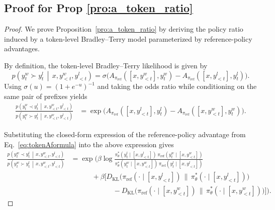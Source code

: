 \documentclass{article}
\theoremstyle{plain}
\theoremstyle{definition}
\theoremstyle{remark}
\begin{document}
\subsection{Proof for Prop \ref{pro:a_token_ratio}}
\label{subsec:proof_a_token_ratio}
\begin{proof}
We prove Proposition~\ref{pro:a_token_ratio} by deriving the policy ratio induced by
a token-level Bradley--Terry model parameterized by reference-policy advantages.

By definition, the token-level Bradley--Terry likelihood is given by
\begin{equation*}
p\!\left(
y_t^w \succ y_t^l
\,\middle|\,
x, y_{<t}^w, y_{<t}^l
\right)
=
\sigma\!\Big(
A_{\pi_{\mathrm{ref}}}([x,y_{<t}^w], y_t^w)
-
A_{\pi_{\mathrm{ref}}}([x,y_{<t}^l], y_t^l)
\Big).
\end{equation*}
Using $\sigma(u)=(1+e^{-u})^{-1}$ and taking the odds ratio while conditioning on the
same pair of prefixes yields
\begin{align*}
\frac{
p\!\left(
y_t^w \prec y_t^l
\,\middle|\,
x, y_{<t}^w, y_{<t}^l
\right)
}{
p\!\left(
y_t^w \succ y_t^l
\,\middle|\,
x, y_{<t}^w, y_{<t}^l
\right)
}
&=
\exp\!\Big(
A_{\pi_{\mathrm{ref}}}([x,y_{<t}^l], y_t^l)
-
A_{\pi_{\mathrm{ref}}}([x,y_{<t}^w], y_t^w)
\Big).
\end{align*}

Substituting the closed-form expression of the reference-policy advantage from
Eq.~\eqref{eq:tokenAformula} into the above expression gives
\begin{align*}
\frac{
p\!\left(
y_t^w \prec y_t^l
\,\middle|\,
x, y_{<t}^w, y_{<t}^l
\right)
}{
p\!\left(
y_t^w \succ y_t^l
\,\middle|\,
x, y_{<t}^w, y_{<t}^l
\right)
}
&=
\exp\Bigg(
\beta \log
\frac{
\pi_\theta^*(y_t^l \mid [x,y_{<t}^l])\,
\pi_{\mathrm{ref}}(y_t^w \mid [x,y_{<t}^w])
}{
\pi_\theta^*(y_t^w \mid [x,y_{<t}^w])\,
\pi_{\mathrm{ref}}(y_t^l \mid [x,y_{<t}^l])
}
\\
&\qquad\quad
+
\beta\Big[
D_{\mathrm{KL}}\!\big(
\pi_{\mathrm{ref}}(\cdot\mid[x,y_{<t}^l])
\,\big\|\,
\pi_\theta^*(\cdot\mid[x,y_{<t}^l])
\big)
\\[-2pt]
&\qquad\qquad\qquad
-
D_{\mathrm{KL}}\!\big(
\pi_{\mathrm{ref}}(\cdot\mid[x,y_{<t}^w])
\,\big\|\,
\pi_\theta^*(\cdot\mid[x,y_{<t}^w])
\big)
\Big]
\Bigg).
\end{align*}


\end{proof}
\end{document}
